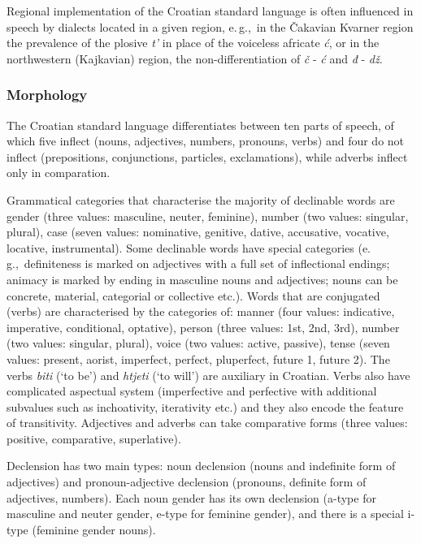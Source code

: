 \begin{multicols}{2}
Regional implementation of the Croatian standard language is often influenced in speech by dialects located in a given region, e.\,g.,~in the Čakavian Kvarner region the prevalence of the plosive \emph{t'} in place of the voiceless africate \emph{ć}, or in the northwestern (Kajkavian) region, the non-differentiation of \emph{č} - \emph{ć} and \emph{đ} - \emph{dž}. 

\subsubsection{Morphology}

The Croatian standard language differentiates between ten parts of speech, of which five inflect (nouns, adjectives, numbers, pronouns, verbs) and four do not inflect (prepositions, conjunctions, particles, exclamations), while adverbs inflect only in comparation.

Grammatical categories that characterise the majority of declinable words are gender (three values: masculine, neuter, feminine), number (two values: singular, plural), case (seven values: nominative, genitive, dative, accusative, vocative, locative, instrumental). Some declinable words have special categories (e.\,g.,~definiteness is marked on adjectives with a full set of inflectional endings; animacy is marked by ending in masculine nouns and adjectives; nouns can be concrete, material, categorial or collective etc.). Words that are conjugated (verbs) are characterised by the categories of: manner (four values: indicative, imperative, conditional, optative), person (three values: 1st, 2nd, 3rd), number (two values: singular, plural), voice (two values: active, passive), tense (seven values: present, aorist, imperfect, perfect, pluperfect, future 1, future 2). The verbs \emph{biti} (‘to be’) and \emph{htjeti} (‘to will’) are auxiliary in Croatian. Verbs also have complicated aspectual system (imperfective and perfective with additional subvalues such as inchoativity, iterativity etc.) and they also encode the feature of transitivity. Adjectives and adverbs can take comparative forms (three values: positive, comparative, superlative).

Declension has two main types: noun declension (nouns and indefinite form of adjectives) and pronoun-adjective declension (pronouns, definite form of adjectives, numbers). Each noun gender has its own declension (a-type for masculine and neuter gender, e-type for feminine gender), and there is a special i-type (feminine gender nouns).


\end{multicols}
